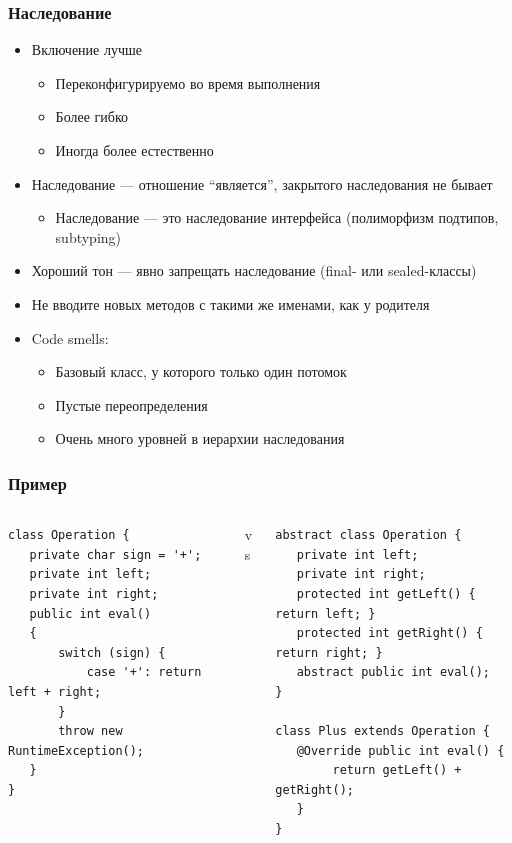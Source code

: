 \documentclass[xetex,mathserif,serif]{beamer}
\begin{document}
	\begin{frame}
		\frametitle{Наследование}
		\begin{itemize}
			\item Включение лучше
			\begin{itemize}
				\item Переконфигурируемо во время выполнения
				\item Более гибко
				\item Иногда более естественно
			\end{itemize}
			\item Наследование --- отношение ``является'', закрытого наследования не бывает
			\begin{itemize}
				\item Наследование --- это наследование интерфейса (полиморфизм подтипов, subtyping)
			\end{itemize}
			\item Хороший тон --- явно запрещать наследование (final- или sealed-классы)
			\item Не вводите новых методов с такими же именами, как у родителя
			\item Code smells:
			\begin{itemize}
				\item Базовый класс, у которого только один потомок
				\item Пустые переопределения
				\item Очень много уровней в иерархии наследования
			\end{itemize}
		\end{itemize}
	\end{frame}

	\begin{frame}[fragile]
		\frametitle{Пример}
		\begin{footnotesize}
			\begin{columns}
				\begin{column}{0.35\textwidth}
					\begin{verbatim}
class Operation {
   private char sign = '+';
   private int left;
   private int right;
   public int eval()
   {
       switch (sign) {
           case '+': return left + right;
       }
       throw new RuntimeException();
   }
}
					\end{verbatim}
				\end{column}
				\begin{column}{0.1\textwidth}
					vs
				\end{column}
				\begin{column}{0.45\textwidth}
					\begin{verbatim}
abstract class Operation {
   private int left;
   private int right;
   protected int getLeft() { return left; }
   protected int getRight() { return right; }
   abstract public int eval();
}

class Plus extends Operation {
   @Override public int eval() { 
        return getLeft() + getRight(); 
   }
}
					\end{verbatim}
				\end{column}
			\end{columns}
		\end{footnotesize}
	\end{frame}
\end{document}
